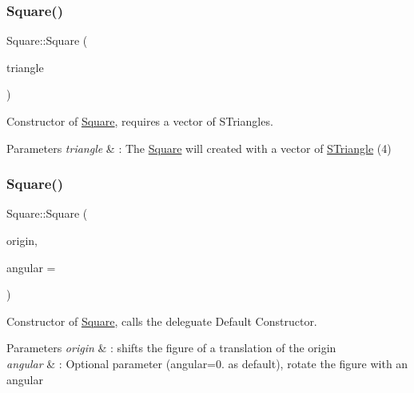\subsubsection{\texorpdfstring{Square()}{Square()}\hspace{0.1cm}{\footnotesize\ttfamily [1/2]}}
{\footnotesize\ttfamily Square\+::\+Square (\begin{DoxyParamCaption}\item[{const std\+::vector$<$ \hyperlink{classSTriangle}{S\+Triangle} $>$ \&}]{triangle }\end{DoxyParamCaption})\hspace{0.3cm}{\ttfamily [explicit]}}



Constructor of \hyperlink{classSquare}{Square}, requires a vector of S\+Triangles. 


\begin{DoxyParams}{Parameters}
{\em triangle} & \+: The \hyperlink{classSquare}{Square} will created with a vector of \hyperlink{classSTriangle}{S\+Triangle} (4) \\
\hline
\end{DoxyParams}
\mbox{\label{classSquare_a5e485c4484e9f56fefbdd47bc7f203f1}} 
\subsubsection{\texorpdfstring{Square()}{Square()}\hspace{0.1cm}{\footnotesize\ttfamily [2/2]}}
{\footnotesize\ttfamily Square\+::\+Square (\begin{DoxyParamCaption}\item[{\hyperlink{classPoint}{Point}$<$ double $>$}]{origin,  }\item[{double}]{angular = {} }\end{DoxyParamCaption})\hspace{0.3cm}{\ttfamily [explicit]}}



Constructor of \hyperlink{classSquare}{Square}, calls the deleguate Default Constructor. 


\begin{DoxyParams}{Parameters}
{\em origin} & \+: shifts the figure of a translation of the origin \\
\hline
{\em angular} & \+: Optional parameter (angular=0. as default), rotate the figure with an angular \\
\hline
\end{DoxyParams}


